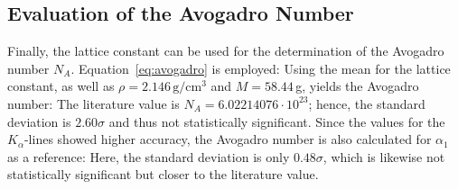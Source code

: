 \subsection{Evaluation of the Avogadro Number}
Finally, the lattice constant can be used for the determination of the Avogadro number $N_A$. Equation~\ref{eq:avogadro} is employed:
Using the mean for the lattice constant, as well as $\rho = 2.146 \, \mathrm{g/cm^3}$ and $M = 58.44\,$g, yields the Avogadro number:
The literature value is $N_A = 6.02214076 \cdot 10^{23}$; hence, the standard deviation is $2.60\sigma$ and thus not statistically significant.
Since the values for the $K_\alpha$-lines showed higher accuracy, the Avogadro number is also calculated for $\alpha_1$ as a reference:
Here, the standard deviation is only $0.48\sigma$, which is likewise not statistically significant but closer to the literature value.